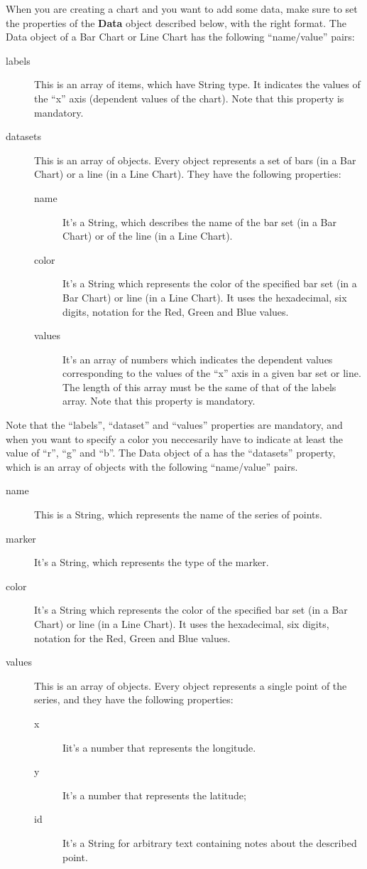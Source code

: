 			When you are creating a chart and you want to add some data, make sure to set the properties of the \textbf{Data} object described below, with the right format.
			 \label{sec:dataBarLine}
				The Data object of a Bar Chart or Line Chart has the following “name/value” pairs:
				\begin{description}
					\item[labels] This is an array of items, which have String type. It indicates the values of the “x” axis (dependent values of the chart). Note that this property is mandatory.
					\item[datasets] This is an array of objects. Every object represents a set of bars (in a Bar Chart) or a line (in a Line Chart). They have the following properties: 
					\begin{description}
						\item[name] It's a String, which describes the name of the bar set (in a Bar Chart) or of the line (in a Line Chart). 
						\item[color] It's a String which represents the color of the specified bar set (in a Bar Chart) or line (in a Line Chart). It uses the hexadecimal, six digits, notation for the Red, Green and Blue values. 
						\item[values] It's an array of numbers which indicates the dependent values corresponding to the values of the “x” axis in a given bar set or line. The length of this array must be the same of that of the labels array. Note that this property is mandatory.
					\end{description}
				\end{description}
				Note that the “labels”, “dataset” and “values” properties are mandatory, and when you want to specify a color you neccesarily have to indicate at least the value of “r”, “g” and “b”.
				The Data object of a  has the “datasets” property, which is an array of objects with the following “name/value” pairs.
				\begin{description}
					\item[name] This is a String, which represents the name of the series of points.
					\item[marker] It's a String, which represents the type of the marker.
					\item[color] It's a String which represents the color of the specified bar set (in a Bar Chart) or line (in a Line Chart). It uses the hexadecimal, six digits, notation for the Red, Green and Blue values. 
					\item[values] This is an array of objects. Every object represents a single point of the series, and they have the following properties:
						\begin{description}
							\item[x] Iit's a number that represents the longitude.
							\item[y] It's a number that represents the latitude;
							\item[id] It's a String for arbitrary text containing notes about the described point.
						\end{description}
				\end{description}
